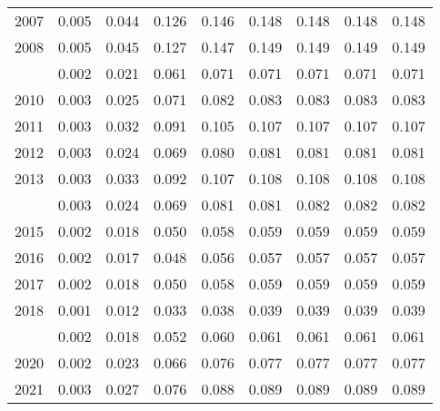 \documentclass[
]{article}
\begin{document}
\begin{longtable}[t]{lrrrrrrrr}
2007 & 0.005 & 0.044 & 0.126 & 0.146 & 0.148 & 0.148 & 0.148 & 0.148\\
2008 & 0.005 & 0.045 & 0.127 & 0.147 & 0.149 & 0.149 & 0.149 & 0.149\\
\addlinespace
2009 & 0.002 & 0.021 & 0.061 & 0.071 & 0.071 & 0.071 & 0.071 & 0.071\\
2010 & 0.003 & 0.025 & 0.071 & 0.082 & 0.083 & 0.083 & 0.083 & 0.083\\
2011 & 0.003 & 0.032 & 0.091 & 0.105 & 0.107 & 0.107 & 0.107 & 0.107\\
2012 & 0.003 & 0.024 & 0.069 & 0.080 & 0.081 & 0.081 & 0.081 & 0.081\\
2013 & 0.003 & 0.033 & 0.092 & 0.107 & 0.108 & 0.108 & 0.108 & 0.108\\
\addlinespace
2014 & 0.003 & 0.024 & 0.069 & 0.081 & 0.081 & 0.082 & 0.082 & 0.082\\
2015 & 0.002 & 0.018 & 0.050 & 0.058 & 0.059 & 0.059 & 0.059 & 0.059\\
2016 & 0.002 & 0.017 & 0.048 & 0.056 & 0.057 & 0.057 & 0.057 & 0.057\\
2017 & 0.002 & 0.018 & 0.050 & 0.058 & 0.059 & 0.059 & 0.059 & 0.059\\
2018 & 0.001 & 0.012 & 0.033 & 0.038 & 0.039 & 0.039 & 0.039 & 0.039\\
\addlinespace
2019 & 0.002 & 0.018 & 0.052 & 0.060 & 0.061 & 0.061 & 0.061 & 0.061\\
2020 & 0.002 & 0.023 & 0.066 & 0.076 & 0.077 & 0.077 & 0.077 & 0.077\\
2021 & 0.003 & 0.027 & 0.076 & 0.088 & 0.089 & 0.089 & 0.089 & 0.089\\*
\end{longtable}
\end{document}
